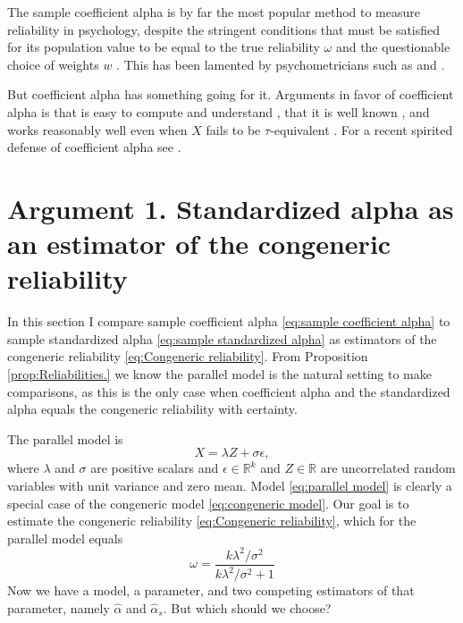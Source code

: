 \documentclass[twoside]{article}
\begin{document}
The sample coefficient alpha is by far the most popular method to
measure reliability in psychology, despite the stringent conditions
that must be satisfied for its population value to be equal to the
true reliability $\omega$ and the questionable choice of weights $w$ \citep{McNeish2019-ea}. This has been lamented by psychometricians such as \citet{McNeish2018-vu} and \citet{Sijtsma2009-hj}. 

But coefficient alpha has something going for it. Arguments in favor of coefficient alpha is that is easy to compute and understand \citep{Socan2000-aa}, that it is well known \citep{Falk2011-ae}, and works reasonably well even when $X$ fails to be $\tau$-equivalent \citep{Raykov1997-bu}. For a recent spirited defense of coefficient alpha see \citep{Raykov2019-yr}.

\section{Argument 1. Standardized alpha as an estimator of the congeneric reliability}
\label{sec:arument 1}

In this section I compare sample coefficient alpha \eqref{eq:sample coefficient alpha} to sample standardized alpha \eqref{eq:sample standardized alpha} as estimators of the congeneric reliability \eqref{eq:Congeneric reliability}. From Proposition \ref{prop:Reliabilities.} we know the parallel model is the natural setting to make comparisons, as this is the only case when coefficient alpha and the standardized alpha equals the congeneric reliability with certainty.

The parallel model is
\begin{equation}
\label{eq:parallel model}
X = \lambda Z + \sigma\epsilon,
\end{equation}
where $\lambda$ and $\sigma$ are positive scalars and $\epsilon\in\mathbb{R}^k$ and $Z\in\mathbb{R}$ are uncorrelated random variables with unit variance and zero mean. Model \eqref{eq:parallel model} is clearly a special case of the congeneric model \eqref{eq:congeneric model}. Our goal is to estimate the congeneric reliability \eqref{eq:Congeneric reliability}, which for the parallel model equals
\begin{equation}
\label{eq:parallel_omega}
\omega = \frac{k\lambda^2/\sigma^2}{k\lambda^2/\sigma^2 + 1}
\end{equation}
Now we have a model, a parameter, and two competing estimators of that parameter, namely $\hat{\alpha}$ and $\hat{\alpha}_s$. But which should we choose? 
\end{document}
